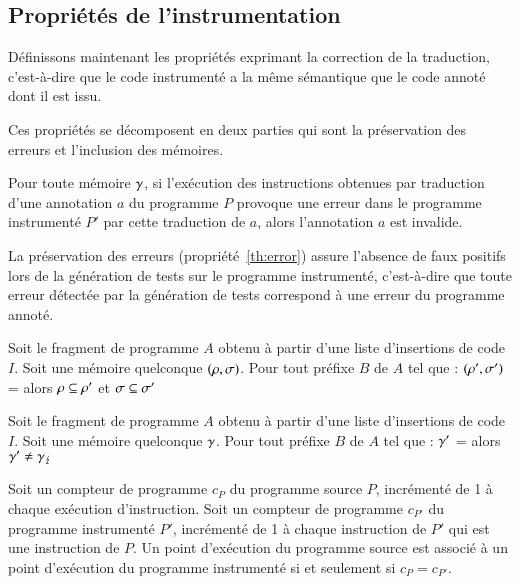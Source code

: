 \subsection{Propriétés de l'instrumentation}
\label{sec:properties}


Définissons maintenant les propriétés exprimant la correction de la traduction,
c'est-à-dire que le code instrumenté a la même sémantique que le code annoté
dont il est issu.

Ces propriétés se décomposent en deux parties qui sont la préservation des
erreurs et l'inclusion des mémoires.

\begin{myproperty}
  \label{th:error}
  Pour toute mémoire $\gamma$, si l'exécution des instructions obtenues
  par traduction d'une annotation $a$
  du programme $P$ provoque une erreur dans le programme instrumenté $P'$ par
  cette traduction de $a$, alors l'annotation $a$ est invalide.
\end{myproperty}

La préservation des erreurs (propriété~\ref{th:error}) assure l'absence de faux
positifs lors de la génération de tests sur le programme instrumenté,
c'est-à-dire que toute erreur détectée par la génération de tests correspond à
une erreur du programme annoté.


\begin{myproperty}
  \label{th:inclusion}
  Soit le fragment de programme $A$ obtenu à partir d'une liste d'insertions de
  code $I$.
  Soit une mémoire quelconque $(\rho, \sigma)$.
  Pour tout préfixe $B$ de $A$ tel que :
  $(\rho', \sigma')$ =  alors
  $\rho \subseteq \rho'$ et $\sigma \subseteq \sigma'$
\end{myproperty}

\begin{myproperty}
  \label{lem:noerror}
  Soit le fragment de programme $A$ obtenu à partir d'une liste d'insertions de
  code $I$.
  Soit une mémoire quelconque $\gamma$.
  Pour tout préfixe $B$ de $A$ tel que :
  $\gamma'$ =  alors
  $\gamma' \neq \gamma_\lightning$
\end{myproperty}

\begin{definition}
  \label{def:exec-point}
  Soit un compteur de programme $c_P$ du programme source $P$, incrémenté de 1 à
  chaque exécution d'instruction.
  Soit un compteur de programme $c_{P'}$ du programme instrumenté $P'$,
  incrémenté de 1 à chaque instruction de $P'$ qui est une instruction de $P$.
  Un point d'exécution du programme source est associé à un point d'exécution du
  programme instrumenté si et seulement si $c_P = c_{P'}$.
\end{definition}

